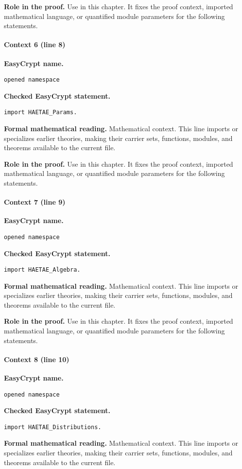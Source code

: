 \noindent\textbf{Role in the proof.}
Use in this chapter. It fixes the proof context, imported mathematical language, or quantified module parameters for the following statements.

\paragraph{Context 6 (line 8)}
\noindent\textbf{EasyCrypt name.}
\begin{lstlisting}[language=EasyCrypt,basicstyle=\ttfamily\scriptsize]
opened namespace
\end{lstlisting}
\noindent\textbf{Checked EasyCrypt statement.}
\begin{lstlisting}[language=EasyCrypt,basicstyle=\ttfamily\scriptsize]
import HAETAE_Params.
\end{lstlisting}
\noindent\textbf{Formal mathematical reading.}
Mathematical context. This line imports or specializes earlier theories, making their carrier sets, functions, modules, and theorems available to the current file.

\noindent\textbf{Role in the proof.}
Use in this chapter. It fixes the proof context, imported mathematical language, or quantified module parameters for the following statements.

\paragraph{Context 7 (line 9)}
\noindent\textbf{EasyCrypt name.}
\begin{lstlisting}[language=EasyCrypt,basicstyle=\ttfamily\scriptsize]
opened namespace
\end{lstlisting}
\noindent\textbf{Checked EasyCrypt statement.}
\begin{lstlisting}[language=EasyCrypt,basicstyle=\ttfamily\scriptsize]
import HAETAE_Algebra.
\end{lstlisting}
\noindent\textbf{Formal mathematical reading.}
Mathematical context. This line imports or specializes earlier theories, making their carrier sets, functions, modules, and theorems available to the current file.

\noindent\textbf{Role in the proof.}
Use in this chapter. It fixes the proof context, imported mathematical language, or quantified module parameters for the following statements.

\paragraph{Context 8 (line 10)}
\noindent\textbf{EasyCrypt name.}
\begin{lstlisting}[language=EasyCrypt,basicstyle=\ttfamily\scriptsize]
opened namespace
\end{lstlisting}
\noindent\textbf{Checked EasyCrypt statement.}
\begin{lstlisting}[language=EasyCrypt,basicstyle=\ttfamily\scriptsize]
import HAETAE_Distributions.
\end{lstlisting}
\noindent\textbf{Formal mathematical reading.}
Mathematical context. This line imports or specializes earlier theories, making their carrier sets, functions, modules, and theorems available to the current file.

